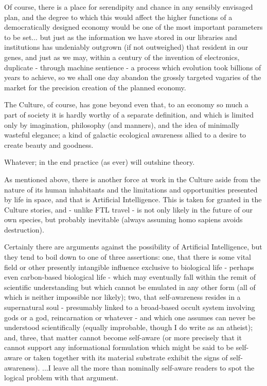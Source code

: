 Of course, there is a place for serendipity and chance in any sensibly envisaged plan, and the degree to which this would affect the higher functions of a democratically designed economy would be one of the most important parameters to be set... but just as the information we have stored in our libraries and institutions has undeniably outgrown (if not outweighed) that resident in our genes, and just as we may, within a century of the invention of electronics, duplicate - through machine sentience - a process which evolution took billions of years to achieve, so we shall one day abandon the grossly targeted vagaries of the market for the precision creation of the planned economy.

The Culture, of course, has gone beyond even that, to an economy so much a part of society it is hardly worthy of a separate definition, and which is limited only by imagination, philosophy (and manners), and the idea of minimally wasteful elegance; a kind of galactic ecological awareness allied to a desire to create beauty and goodness.

Whatever; in the end practice (as ever) will outshine theory.

As mentioned above, there is another force at work in the Culture aside from the nature of its human inhabitants and the limitations and opportunities presented by life in space, and that is Artificial Intelligence. This is taken for granted in the Culture stories, and - unlike FTL travel - is not only likely in the future of our own species, but probably inevitable (always assuming homo sapiens avoids destruction).

Certainly there are arguments against the possibility of Artificial Intelligence, but they tend to boil down to one of three assertions: one, that there is some vital field or other presently intangible influence exclusive to biological life - perhaps even carbon-based biological life - which may eventually fall within the remit of scientific understanding but which cannot be emulated in any other form (all of which is neither impossible nor likely); two, that self-awareness resides in a supernatural soul - presumably linked to a broad-based occult system involving gods or a god, reincarnation or whatever - and which one assumes can never be understood scientifically (equally improbable, though I do write as an atheist); and, three, that matter cannot become self-aware (or more precisely that it cannot support any informational formulation which might be said to be self-aware or taken together with its material substrate exhibit the signs of self-awareness). ...I leave all the more than nominally self-aware readers to spot the logical problem with that argument.

